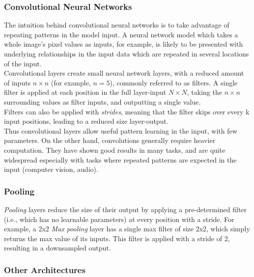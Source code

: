 \subsubsection{Convolutional Neural Networks}

The intuition behind convolutional neural networks is to take advantage of repeating patterns in the model input. A neural network model which takes a whole image's pixel values as inputs, for example, is likely to be presented with underlying relationships in the input data which are repeated in several locations of the input.\\

Convolutional layers create small neural network layers, with a reduced amount of inputs $n\times n$ (for example, $n = 5$), commonly referred to as filters. A single filter is applied at each position in the full layer-input $N\times N$, taking the $n\times n$ surrounding values as filter inputs, and outputting a single value.\\

Filters can also be applied with \textit{strides}, meaning that the filter skips over every k input positions, leading to a reduced size layer-output.\\

Thus convolutional layers allow useful pattern learning in the input, with few parameters. On the other hand, convolutions generally require heavier computation. They have shown good results in many tasks, and are quite widespread especially with tasks where repeated patterns are expected in the input (computer vision, audio).\\

\subsubsection{Pooling}

\textit{Pooling} layers reduce the size of their output by applying a pre-determined filter (i.e., which has no learnable parameters) at every position with a stride. For example, a 2x2 \textit{Max pooling} layer has a single max filter of size 2x2, which simply returns the max value of its inputs. This filter is applied with a stride of 2, resulting in a downsampled output.\\

\subsubsection{Other Architectures}

